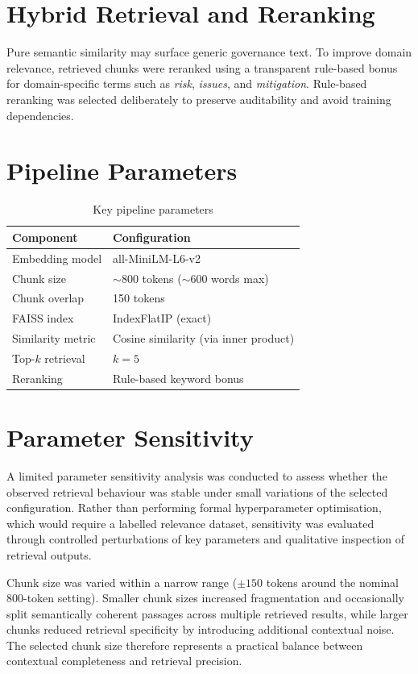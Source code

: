 \documentclass[12pt,a4paper]{report}
\begin{document}
\section{Hybrid Retrieval and Reranking}
Pure semantic similarity may surface generic governance text. To improve domain relevance, retrieved chunks were reranked using a transparent rule-based bonus for domain-specific terms such as \emph{risk}, \emph{issues}, and \emph{mitigation}. Rule-based reranking was selected deliberately to preserve auditability and avoid training dependencies.

\section{Pipeline Parameters}
\begin{table}[H]
\centering
\caption{Key pipeline parameters}
\begin{tabular}{ll}
\toprule
Component & Configuration \\
\midrule
Embedding model & all-MiniLM-L6-v2 \\
Chunk size & $\sim$800 tokens ($\sim$600 words max) \\
Chunk overlap & 150 tokens \\
FAISS index & IndexFlatIP (exact) \\
Similarity metric & Cosine similarity (via inner product) \\
Top-$k$ retrieval & $k = 5$ \\
Reranking & Rule-based keyword bonus \\
\bottomrule
\end{tabular}
\end{table}

\section{Parameter Sensitivity}

A limited parameter sensitivity analysis was conducted to assess whether the observed retrieval behaviour was stable under small variations of the selected configuration. Rather than performing formal hyperparameter optimisation, which would require a labelled relevance dataset, sensitivity was evaluated through controlled perturbations of key parameters and qualitative inspection of retrieval outputs.

Chunk size was varied within a narrow range (\(\pm 150\) tokens around the nominal 800-token setting). Smaller chunk sizes increased fragmentation and occasionally split semantically coherent passages across multiple retrieved results, while larger chunks reduced retrieval specificity by introducing additional contextual noise. The selected chunk size therefore represents a practical balance between contextual completeness and retrieval precision.
\end{document}
